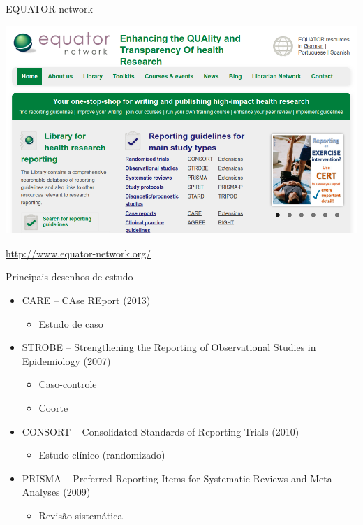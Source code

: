 \documentclass{beamer}
\begin{document}
\begin{frame}{EQUATOR network}
  \begin{center}
    \includegraphics[width=\textwidth]{Metodos/equator-net}

    \bigskip
    \tiny
    \url{http://www.equator-network.org/}
  \end{center}
\end{frame}

\begin{frame}{Principais desenhos de estudo}
  \begin{itemize}
    \footnotesize
  \item CARE -- {\scriptsize CAse REport (2013)}
    \begin{itemize}
    \item Estudo de caso
    \end{itemize}
  \end{itemize}
  \begin{itemize}
    \footnotesize
  \item STROBE -- {\scriptsize Strengthening the Reporting of Observational Studies in Epidemiology (2007)}
    \begin{itemize}
    \item Caso-controle
    \item Coorte
    \end{itemize}
  \end{itemize}
  \begin{itemize}
  \item CONSORT -- {\scriptsize Consolidated Standards of Reporting Trials (2010)}
    \begin{itemize}
      \footnotesize
    \item Estudo clínico (randomizado)
    \end{itemize}
  \end{itemize}
  \begin{itemize}
    \footnotesize
  \item<2-> PRISMA -- {\scriptsize Preferred Reporting Items for Systematic Reviews and Meta-Analyses (2009)}
    \begin{itemize}
    \item Revisão sistemática
    \end{itemize}
  \end{itemize}
\end{frame}
\end{document}
